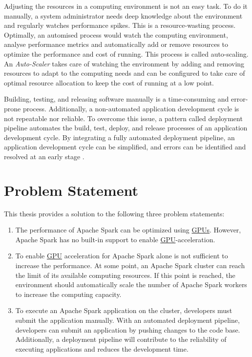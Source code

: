 Adjusting the resources in a computing environment is not an easy task. To do it manually, a system administrator needs deep knowledge about the environment and regularly watches performance spikes. This is a resource-wasting process. Optimally, an automised process would watch the computing environment, analyse performance metrics and automatically add or remove resources to optimize the performance and cost of running. This process is called auto-scaling.
An \textit{Auto-Scaler} takes care of watching the environment by adding and removing resources to adapt to the computing needs and can be configured to take care of optimal resource allocation to keep the cost of running at a low point.


Building, testing, and releasing software manually is a time-consuming and error-prone process. Additionally, a non-automated application development cycle is not repeatable nor reliable.
To overcome this issue, a pattern called deployment pipeline automates the build, test, deploy, and release processes of an application development cycle.
By integrating a fully automated deployment pipeline, an application development cycle can be simplified, and errors can be identified and resolved at an early stage \cite{Farley2010CI}.


\section{Problem Statement}
\label{sec:01_introduction_problem}
This thesis provides a solution to the following three problem statements:

\begin{enumerate}
\item
The performance of Apache Spark can be optimized using \hyperlink{abbr:gpu}{GPUs}.
However, Apache Spark has no built-in support to enable \hyperlink{abbr:gpu}{GPU}-acceleration.

\item
To enable \hyperlink{abbr:gpu}{GPU} acceleration for Apache Spark alone is not sufficient to increase the performance.
At some point, an Apache Spark cluster can reach the limit of its available computing resources.
If this point is reached, the environment should automatically scale the number of Apache Spark workers to increase the computing capacity.

\item
To execute an Apache Spark application on the cluster, developers must submit the application manually.
With an automated deployment pipeline, developers can submit an application by pushing changes to the code base.
Additionally, a deployment pipeline will contribute to the reliability of executing applications and reduces the development time.
\end{enumerate}


